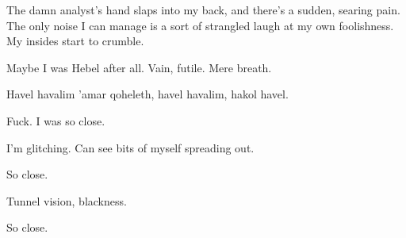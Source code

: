 The damn analyst's hand slaps into my back, and there's a sudden, searing pain. The only noise I can manage is a sort of strangled laugh at my own foolishness. My insides start to crumble.

Maybe I was Hebel after all. Vain, futile. Mere breath.

Havel havalim 'amar qoheleth, havel havalim, hakol havel.

Fuck. I was so close.

I'm glitching. Can see bits of myself spreading out.

So close.

Tunnel vision, blackness.

So close.
